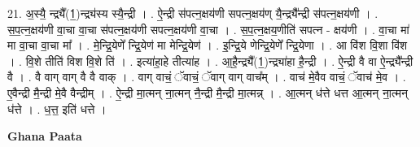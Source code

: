 \documentclass[17pt]{extarticle}
\begin{document}
21. अ॒स्यै॒ न्द्र्यै᳚(1॒)न्द्र्य॑स्य स्यै॒न्द्री । . ऐ॒न्द्री स॑पत्न॒क्षय॑णी सपत्न॒क्षय॑ण् यै॒न्द्र्यै᳚न्द्री स॑पत्न॒क्षय॑णी । . स॒प॒त्न॒क्षय॑णी वा॒चा वा॒चा स॑पत्न॒क्षय॑णी सपत्न॒क्षय॑णी वा॒चा । . स॒प॒त्न॒क्षय॒णीति॑ सपत्न - क्षय॑णी । . वा॒चा मा॑ मा वा॒चा वा॒चा मा᳚ । . मे॒न्द्रि॒येणे᳚ न्द्रि॒येण॑ मा मेन्द्रि॒येण॑ । . इ॒न्द्रि॒ये णेन्द्रि॒येणे᳚ न्द्रि॒येणा । . आ वि॑श वि॒शा वि॑श । . वि॒शे तीति॑ विश वि॒शे ति॑ । . इत्या॑हा॒हे तीत्या॑ह । . आ॒है॒न्द्र्यै᳚(1॒)न्द्र्या॑हा है॒न्द्री । . ऐ॒न्द्री वै वा ऐ॒न्द्र्यै᳚न्द्री वै । . वै वाग् वाग् वै वै वाक् । . वाग् वाचं॒ ॅवाचं॒ ॅवाग् वाग् वाच᳚म् । . वाच॑ मे॒वैव वाचं॒ ॅवाच॑ मे॒व । . ए॒वैन्द्री मै॒न्द्री मे॒वै वैन्द्रीम् । . ऐ॒न्द्री मा॒त्मन् ना॒त्मन् नै॒न्द्री मै॒न्द्री मा॒त्मन्न् । . आ॒त्मन् ध॑त्ते धत्त आ॒त्मन् ना॒त्मन् ध॑त्ते । . ध॒त्त॒ इति॑ धत्ते । \newline

\textbf{Ghana Paata } \newline
\end{document}
